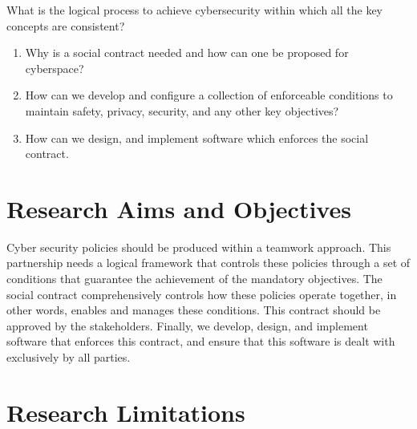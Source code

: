 What is the logical process to achieve cybersecurity within which all the key concepts are consistent?
\begin{enumerate}
\item Why is a social contract needed and how can one be proposed for cyberspace?
\item How can we develop and configure a collection of enforceable conditions to maintain safety, privacy, security, and any other key objectives?
\item How can we design, and implement software which enforces the social contract.%
\end{enumerate}



\section{Research Aims and Objectives}
Cyber security policies should be produced within a teamwork approach.  This partnership needs a logical framework that controls these policies through a set of conditions that guarantee the achievement of the mandatory objectives.  The social contract comprehensively controls how these policies operate together, in other words, enables and manages these conditions.  This contract should be approved by the stakeholders. Finally, we develop, design, and implement software that enforces this contract, and ensure that this software is dealt with exclusively by all parties.

\section{Research Limitations}

